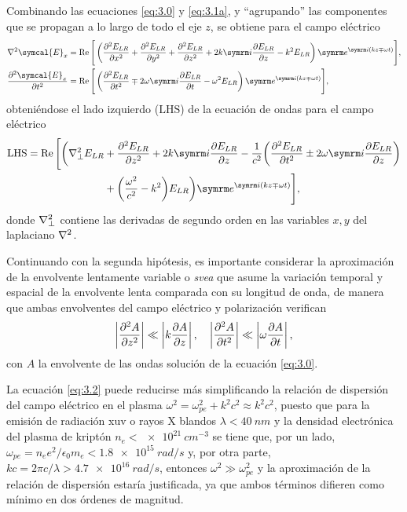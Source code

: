 Combinando las ecuaciones \eqref{eq:3.0} y \eqref{eq:3.1a}, y \enquote{agrupando} las componentes que se propagan a lo largo de todo el eje $z$, se obtiene para el campo eléctrico
\begin{align}
  \laplacian \symcal{E}_{x} 
  &= 
  \RE \Bigg[\left(\pdvN{E_{LR}}{x}{2} + \pdvN{E_{LR}}{y}{2} + \pdvN{E_{LR}}{z}{2} + 2k \iu \pdv{E_{LR}}{z} - k^{2}E_{LR}\right)\eu^{\iu (kz \mp \omega t)}\Bigg], \\
  \pdvN{\symcal{E}_{x}}{t}{2}
  &= 
  \RE \Bigg[\left(\pdvN{E_{LR}}{t}{2} \mp 2 \omega \iu \pdv{E_{LR}}{t} - \omega^{2}E_{LR}\right)\eu^{\iu (kz \mp \omega t)}\Bigg],
\end{align}
obteniéndose el lado izquierdo ($\mathrm{LHS}$) de la ecuación de ondas para el campo eléctrico
\begin{equation}\label{eq:3.2}
  \begin{split}
    \mathrm{LHS} = \RE \Bigg[\bigg(\laplacian_{\perp}E_{LR} &+ \pdvN{E_{LR}}{z}{2} + 2k \iu \pdv{E_{LR}}{z} - \frac{1}{c^{2}}\bigg(\pdvN{E_{LR}}{t}{2} \pm 2 \omega \iu \pdv{E_{LR}}{z}\bigg) \\
      &+  \bigg(\frac{\omega^{2}}{c^{2}} - k^{2}\bigg)E_{LR}\bigg)\eu^{\iu(kz \mp \omega t)}\Bigg],
  \end{split}
\end{equation}
donde $\nabla^2_{\perp}$ contiene las derivadas de segundo orden en las variables $x, y$ del laplaciano $\nabla^2 $.

Continuando con la segunda hipótesis, es importante considerar la aproximación de la envolvente lentamente variable o \emph{\acrfull{svea}} que asume la variación temporal y espacial de la envolvente lenta\autocite{Larroche2000} comparada con su longitud de onda, de manera que ambas envolventes del campo eléctrico y polarización verifican
\begin{equation}\label{eq:3.3}
  \left|\frac{\partial^{2}A}{\partial{z}^{2}}\right| \ll \left|k \frac{\partial A}{\partial z}\right|, \quad \left|\frac{\partial^{2}A}{\partial{t}^{2}}\right| \ll \left|\omega \frac{\partial A}{\partial t}\right|,
\end{equation}
con $A$ la envolvente de las ondas solución de la ecuación \eqref{eq:3.0}. 

La ecuación \eqref{eq:3.2} puede reducirse más simplificando la relación de dispersión del campo eléctrico en el plasma $\omega^{2} = \omega^{2}_{pe} + k^{2}c^{2}\approx k^{2}c^{2}$, puesto que para la emisión de radiación \acrshort{xuv} o rayos X blandos $\lambda<\qty{40}{nm}$ y la densidad electrónica del plasma de kriptón $n_e<\qty{e21}{cm^{-3}}$ se tiene que, por un lado, $\omega_{pe}=n_{e}e^{2}/\epsilon_{0}m_{e}<\qty{1,8e15}{rad/s}$ y, por otra parte, $kc=2 \pi c/\lambda>\qty{4,7e16}{rad/s}$, entonces $\omega^{2} \gg \omega_{pe}^{2}$ y la aproximación de la relación de dispersión estaría justificada, ya que ambos términos difieren como mínimo en dos órdenes de magnitud. 

